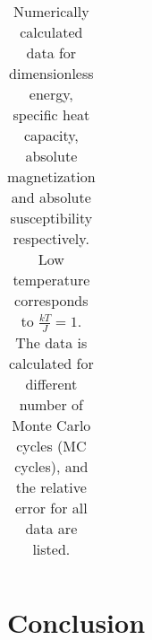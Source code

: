 \documentclass[12pt]{article}
\begin{document}
\begin{flushleft}
\begin{table}[!h]
\begin{center}
\begin{tabular}{| c | c | c || c | c | c |}
  \hline
\end{tabular}
\end{center}
\caption{\label{tab:numeric_low_T}Numerically calculated data for dimensionless energy, specific heat capacity, absolute magnetization and absolute susceptibility respectively. Low temperature corresponds to $\frac{kT}{J} = 1$. The data is calculated for different number of Monte Carlo cycles (MC cycles), and the relative error for all data are listed.}
\end{table}




























\newpage
\section{Conclusion}


\end{flushleft}
\end{document}
